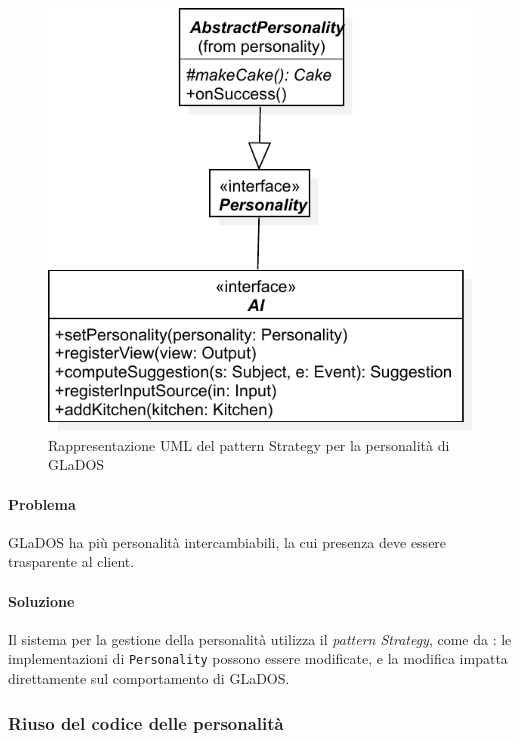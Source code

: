 \documentclass[a4paper,12pt]{report}
\begin{document}
\begin{figure}[H]
	\centering{}
	\includegraphics[width=\textwidth]{img/strategy}
	\caption{Rappresentazione UML del pattern Strategy per la personalità di GLaDOS}
	\label{img:strategy}
\end{figure}

\paragraph{Problema} GLaDOS ha più personalità intercambiabili, la cui presenza deve essere trasparente al client.

\paragraph{Soluzione} Il sistema per la gestione della personalità utilizza il \textit{pattern Strategy}, come da
: le implementazioni di \texttt{Personality} possono essere modificate, e la
modifica impatta direttamente sul comportamento di GLaDOS.

\subsubsection{Riuso del codice delle personalità}
\end{document}
